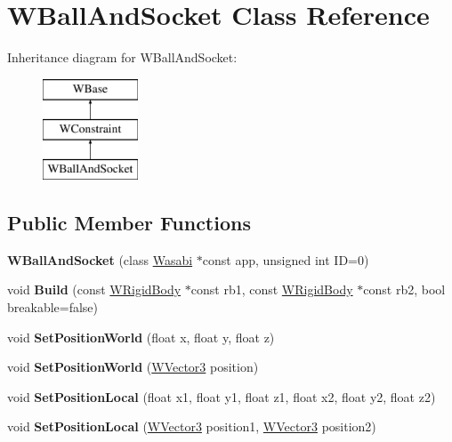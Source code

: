 \hypertarget{class_w_ball_and_socket}{}\section{W\+Ball\+And\+Socket Class Reference}
\label{class_w_ball_and_socket}
Inheritance diagram for W\+Ball\+And\+Socket\+:\begin{figure}[H]
\begin{center}
\leavevmode
\includegraphics[height=3.000000cm]{class_w_ball_and_socket}
\end{center}
\end{figure}
\subsection*{Public Member Functions}
\begin{DoxyCompactItemize}
\item 
{\bfseries W\+Ball\+And\+Socket} (class \hyperlink{class_wasabi}{Wasabi} $\ast$const app, unsigned int ID=0)\hypertarget{class_w_ball_and_socket_ad7e5a63d5acf67fcccb116c9be8bb092}{}\label{class_w_ball_and_socket_ad7e5a63d5acf67fcccb116c9be8bb092}

\item 
void {\bfseries Build} (const \hyperlink{class_w_rigid_body}{W\+Rigid\+Body} $\ast$const rb1, const \hyperlink{class_w_rigid_body}{W\+Rigid\+Body} $\ast$const rb2, bool breakable=false)\hypertarget{class_w_ball_and_socket_a9554bad3896ba844816a18f60ec73dfd}{}\label{class_w_ball_and_socket_a9554bad3896ba844816a18f60ec73dfd}

\item 
void {\bfseries Set\+Position\+World} (float x, float y, float z)\hypertarget{class_w_ball_and_socket_adba0108f07273ccc85ba1799c8392e59}{}\label{class_w_ball_and_socket_adba0108f07273ccc85ba1799c8392e59}

\item 
void {\bfseries Set\+Position\+World} (\hyperlink{class_w_vector3}{W\+Vector3} position)\hypertarget{class_w_ball_and_socket_a696b0c3911679bcba40377319c9a848e}{}\label{class_w_ball_and_socket_a696b0c3911679bcba40377319c9a848e}

\item 
void {\bfseries Set\+Position\+Local} (float x1, float y1, float z1, float x2, float y2, float z2)\hypertarget{class_w_ball_and_socket_a260b77aeca62ace57896648e44f0a8c2}{}\label{class_w_ball_and_socket_a260b77aeca62ace57896648e44f0a8c2}

\item 
void {\bfseries Set\+Position\+Local} (\hyperlink{class_w_vector3}{W\+Vector3} position1, \hyperlink{class_w_vector3}{W\+Vector3} position2)\hypertarget{class_w_ball_and_socket_a0a83abc02f3f78df3ea7611b2a38ac48}{}\label{class_w_ball_and_socket_a0a83abc02f3f78df3ea7611b2a38ac48}

\end{DoxyCompactItemize}
